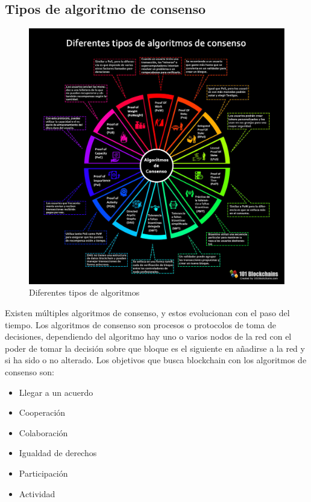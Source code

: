 \subsection{Tipos de algoritmo de consenso}

\begin{figure}[h!]
  \centering
  \includegraphics[width=0.8\linewidth]{figs/EstadoArte/Blockchain/algoritmosConsenso.jpeg}
  \caption[Algoritmos de Consenso]{Diferentes tipos de algoritmos}
  \label{fig:consenso}
\end{figure}

Existen múltiples algoritmos de consenso, y estos evolucionan con el paso del tiempo. Los algoritmos de consenso son procesos o protocolos de toma de decisiones, dependiendo del algoritmo hay uno o varios nodos de la red con el poder de tomar la decisión sobre que bloque es el siguiente en añadirse a la red y si ha sido o no alterado. Los objetivos que busca blockchain con los algoritmos de consenso son:

\begin{itemize}
\item Llegar a un acuerdo
\item Cooperación
\item Colaboración
\item Igualdad de derechos
\item Participación
\item Actividad
\end{itemize}


